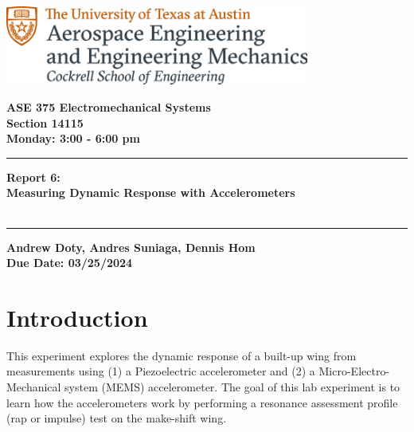 \documentclass{article}
\begin{document}
\begin{titlepage}
  \centering
  \includegraphics[width=10cm]{ase-logo-formal.png}  %
  \vspace{1cm}  %
 
  \Large \textbf{ASE 375 Electromechanical Systems}\\
  \large \textbf{Section 14115}\\
  \vspace{0.5cm}
  \textbf{Monday: 3:00 - 6:00 pm}\\
 
  \vspace{1cm}
 
  \hrule
  \vspace{0.5cm}
 
  \Huge \textbf{Report 6:\\
  Measuring Dynamic Response with Accelerometers}\\
  \Huge \textbf{}\\
 
  \vspace{0.5cm}
  \hrule
 
  \vspace{1cm}
 
  \normalsize \textbf{Andrew Doty, Andres Suniaga, Dennis Hom}\\
  \normalsize \textbf{Due Date: 03/25/2024}
 
\end{titlepage}
\newpage

\tableofcontents
\thispagestyle{empty}
\newpage

\section{Introduction}
This experiment explores the dynamic response of a built-up wing from measurements using (1) a Piezoelectric accelerometer and (2) a Micro-Electro-Mechanical system (MEMS) accelerometer. The goal of this lab experiment is to learn how the accelerometers work by performing a resonance assessment profile (rap or impulse) test on the make-shift wing. 
\vspace{5mm}
\end{document}

